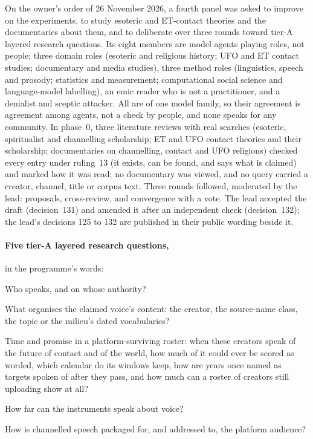 On the owner's order of 26 November 2026, a fourth panel was asked to improve on the experiments, to study esoteric and
ET-contact theories and the documentaries about them, and to deliberate over three rounds toward tier-A layered research
questions. Its eight members are model agents playing roles, not people: three domain roles (esoteric and religious
history; UFO and ET contact studies; documentary and media studies), three method roles (linguistics, speech and
prosody; statistics and measurement; computational social science and language-model labelling), an emic reader who is
not a practitioner, and a denialist and sceptic attacker. All are of one model family, so their agreement is agreement
among agents, not a check by people, and none speaks for any community. In phase~0, three literature reviews with real
searches (esoteric, spiritualist and channelling scholarship; ET and UFO contact theories and their scholarship;
documentaries on channelling, contact and UFO religions) checked every entry under ruling~13 (it exists, can be found,
and says what is claimed) and marked how it was read; no documentary was viewed, and no query carried a creator, channel,
title or corpus text. Three rounds followed, moderated by the lead: proposals, cross-review, and convergence with a vote.
The lead accepted the draft (decision~131) and amended it after an independent check (decision~132);
the lead's decisions 125 to 132 are published in their public wording beside it.

\paragraph{Five tier-A layered research questions,} in the programme's words:
\begin{description}
\setlength{\itemsep}{1pt}
\item[RQ-A.] Who speaks, and on whose authority?
\item[RQ-B.] What organises the claimed voice's content: the creator, the source-name class, the topic or the milieu's
dated vocabularies?
\item[RQ-C.] Time and promise in a platform-surviving roster: when these creators speak of the future of contact and of
the world, how much of it could ever be scored as worded, which calendar do its windows keep, how are years once named
as targets spoken of after they pass, and how much can a roster of creators still uploading show at all?
\item[RQ-D.] How far can the instruments speak about voice?
\item[RQ-E.] How is channelled speech packaged for, and addressed to, the platform audience?
\end{description}


